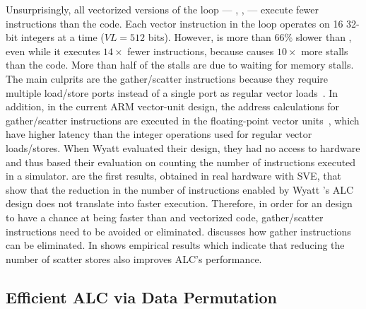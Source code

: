Unsurprisingly, all vectorized versions of the loop --- \ifconv, \ALC, \ALC  --- execute fewer instructions than the \scalar code.
Each vector instruction in the loop operates on 16 32-bit integers at a time ($VL = 512$ bits).
However, \ALC is more than $66\%$ slower than \scalar, even while it executes $14\times$ fewer instructions, because \ALC causes $10\times$ more stalls than the \scalar code.
More than half of the stalls are due to waiting for memory stalls.
The main culprits are the gather/scatter instructions because they require multiple load/store ports instead of a single port as regular vector loads~\cite{A64FXmanual}.
In addition, in the current ARM vector-unit design, the address calculations for gather/scatter instructions are executed in the floating-point vector units~\cite{A64FXmanual}, which have higher latency than the integer operations used for regular vector loads/stores.
When Wyatt \etal evaluated their design, they had no access to hardware and thus based their evaluation on counting the number of instructions executed in a simulator.
 are the first results, obtained in real hardware with SVE, that show that the reduction in the number of instructions enabled by Wyatt \etal's ALC design does not translate into faster execution.
Therefore, in order for an \ALC design to have a chance at being faster than \ifconverted and vectorized code, gather/scatter instructions need to be avoided or eliminated.
 discusses how gather instructions can be eliminated.
In  shows empirical results which indicate that reducing the number of scatter stores also improves ALC's performance.

\subsection{Efficient ALC via Data Permutation}
\label{sec:alc-data-permutation}

